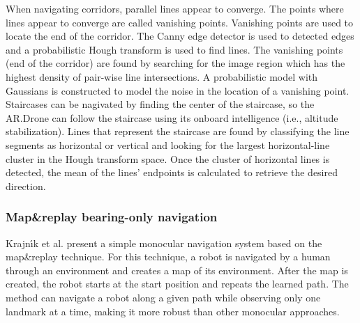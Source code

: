 When navigating corridors, parallel lines appear to converge.
The points where lines appear to converge are called vanishing points.
Vanishing points are used to locate the end of the corridor. 
The Canny edge detector \cite{canny1986computational} is used to detected edges and a probabilistic Hough transform \cite{kiryati1991probabilistic} is used to find lines.
The vanishing points (end of the corridor) are found by searching for the image region which has the highest density of pair-wise line intersections.
A probabilistic model with Gaussians is constructed to model the noise in the location of a vanishing point.
Staircases can be nagivated by finding the center of the staircase, so the AR.Drone can follow the staircase using its onboard intelligence (i.e., altitude stabilization).
Lines that represent the staircase are found by classifying the line segments as horizontal or vertical and looking for the largest horizontal-line cluster in the Hough transform space.
Once the cluster of horizontal lines is detected, the mean of the lines' endpoints is calculated to retrieve the desired direction.

\subsubsection{Map\&replay bearing-only navigation}
Krajn{\'\i}k et al. \cite{krajník2010simple,faiglsurveillance,krajník2011ar} present a simple monocular navigation system based on the map\&replay technique.
For this technique, a robot is navigated by a human through an environment and creates a map of its environment.
After the map is created, the robot starts at the start position and repeats the learned path.
The method can navigate a robot along a given path while observing only one landmark at a time, making it more robust than other monocular approaches.

